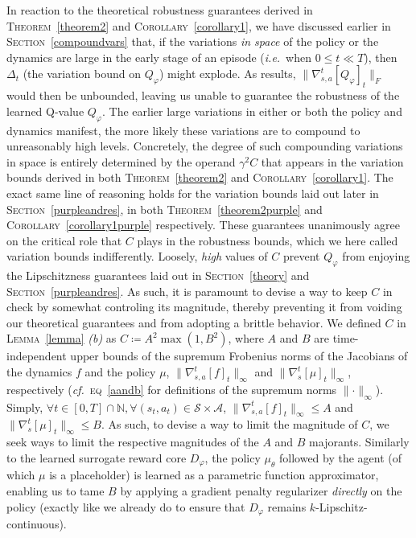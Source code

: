 In reaction to the theoretical robustness guarantees derived in
\textsc{Theorem}~\ref{theorem2} and \textsc{Corollary}~\ref{corollary1},
we have discussed earlier in \textsc{Section}~\ref{compoundvars} that,
if the variations \emph{in space} of the policy or the dynamics are large
in the early stage of an episode (\textit{i.e.}~when $0 \leq t \ll T$),
then $\Delta_t$ (the variation bound on $Q_\varphi$) might explode.
As results, $\lVert \nabla_{s,a}^t[Q_\varphi]_t \rVert _F$ would then be unbounded,
leaving us unable to guarantee the robustness of the learned Q-value $Q_\varphi$.
The earlier large variations in either or both the policy and dynamics manifest,
the more likely these variations are to compound to unreasonably high levels.
Concretely, the degree of such compounding variations in space is entirely determined by
the operand $\gamma^2 C$ that appears in the variation bounds derived in both
\textsc{Theorem}~\ref{theorem2} and \textsc{Corollary}~\ref{corollary1}.
The exact same line of reasoning holds for the variation bounds laid out later in
\textsc{Section}~\ref{purpleandres}, in both
\textsc{Theorem}~\ref{theorem2purple} and \textsc{Corollary}~\ref{corollary1purple} respectively.
These guarantees unanimously agree on the critical role that $C$ plays in
the robustness bounds, which we here called variation bounds indifferently.
Loosely, \emph{high} values of $C$ prevent $Q_\varphi$ from enjoying the
Lipschitzness guarantees
laid out in \textsc{Section}~\ref{theory} and \textsc{Section}~\ref{purpleandres}.
As such, it is paramount to devise a way to keep $C$ in check
by somewhat controling its magnitude,
thereby preventing it from voiding our theoretical guarantees
and from adopting a brittle behavior.
We defined $C$ in \textsc{Lemma}~\ref{lemma} \textit{(b)} as
$C \coloneqq A^2 \max(1, B^2)$, where $A$ and $B$ are time-independent upper bounds of
the supremum Frobenius norms of the Jacobians of the dynamics $f$ and the policy $\mu$,
$\lVert\nabla_{s,a}^t[f]_t\rVert _\infty$ and $\lVert\nabla_s^t[\mu]_t\rVert _\infty$,
respectively
(\textit{cf.}~\textsc{eq}~\ref{aandb} for definitions of the supremum norms $\lVert \cdot \rVert _\infty$).
Simply,
$\forall t \in [0, T] \cap \mathbb{N},
\forall (s_t, a_t) \in \mathcal{S} \times \mathcal{A}$,
$\lVert\nabla_{s,a}^t[f]_t\rVert _\infty \leq A$
and $\lVert\nabla_s^t[\mu]_t\rVert _\infty \leq B$.
As such, to devise a way to limit the magnitude of $C$,
we seek ways to limit the respective magnitudes of the $A$ and $B$ majorants.
Similarly to the learned surrogate reward core $D_\varphi$, the policy $\mu_\theta$
followed by the agent (of which $\mu$ is a placeholder) is learned as a parametric
function approximator, enabling us to tame $B$ by applying a gradient penalty regularizer
\emph{directly} on the policy (exactly like we already do to ensure that $D_\varphi$
remains $k$-Lipschitz-continuous).

